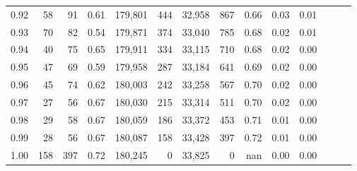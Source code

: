 \begin{tabular}{rrrrrrrrrrrrrr}
0.92 &     58 &   91 &  0.61 &  179,801 &      444 &  32,958 &     867 &  0.66 &  0.03 &      0.01 \\
0.93 &     70 &   82 &  0.54 &  179,871 &      374 &  33,040 &     785 &  0.68 &  0.02 &      0.01 \\
0.94 &     40 &   75 &  0.65 &  179,911 &      334 &  33,115 &     710 &  0.68 &  0.02 &      0.00 \\
0.95 &     47 &   69 &  0.59 &  179,958 &      287 &  33,184 &     641 &  0.69 &  0.02 &      0.00 \\
0.96 &     45 &   74 &  0.62 &  180,003 &      242 &  33,258 &     567 &  0.70 &  0.02 &      0.00 \\
0.97 &     27 &   56 &  0.67 &  180,030 &      215 &  33,314 &     511 &  0.70 &  0.02 &      0.00 \\
0.98 &     29 &   58 &  0.67 &  180,059 &      186 &  33,372 &     453 &  0.71 &  0.01 &      0.00 \\
0.99 &     28 &   56 &  0.67 &  180,087 &      158 &  33,428 &     397 &  0.72 &  0.01 &      0.00 \\
1.00 &    158 &  397 &  0.72 &  180,245 &        0 &  33,825 &       0 &   nan &  0.00 &      0.00 \\
\bottomrule
\end{tabular}

